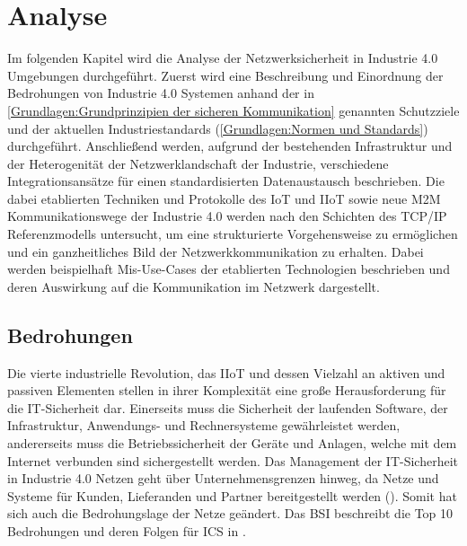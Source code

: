 \chapter{Analyse}
\label{Analyse}
Im folgenden Kapitel wird die Analyse der Netzwerksicherheit in Industrie 4.0 Umgebungen durchgeführt. Zuerst wird eine Beschreibung und Einordnung der Bedrohungen von Industrie 4.0 Systemen anhand der in \autoref{Grundlagen:Grundprinzipien der sicheren Kommunikation} genannten Schutzziele und der aktuellen Industriestandards (\autoref{Grundlagen:Normen und Standards}) durchgeführt. Anschließend werden, aufgrund der bestehenden Infrastruktur und der Heterogenität der Netzwerklandschaft der Industrie, verschiedene Integrationsansätze für einen standardisierten Datenaustausch beschrieben. Die dabei etablierten Techniken und Protokolle des \ac{IoT} und \ac{IIoT} sowie neue \ac{M2M} Kommunikationswege der Industrie 4.0 werden nach den Schichten des \ac{TCP}/\ac{IP} Referenzmodells untersucht, um eine strukturierte Vorgehensweise zu ermöglichen und ein ganzheitliches Bild der Netzwerkkommunikation zu erhalten. Dabei werden beispielhaft Mis-Use-Cases der etablierten Technologien beschrieben und deren Auswirkung auf die Kommunikation im Netzwerk dargestellt.

\section{Bedrohungen}
\label{Analyse:Bedrohungen}
Die vierte industrielle Revolution, das \ac{IIoT} und dessen Vielzahl an aktiven und passiven Elementen stellen in ihrer Komplexität eine große Herausforderung für die IT-Sicherheit dar. Einerseits muss die Sicherheit der laufenden Software, der Infrastruktur, Anwendungs- und Rechnersysteme gewährleistet werden, andererseits muss die Betriebssicherheit der Geräte und Anlagen, welche mit dem Internet verbunden sind sichergestellt werden. Das Management der IT-Sicherheit in Industrie 4.0 Netzen geht über Unternehmensgrenzen hinweg, da Netze und Systeme für Kunden, Lieferanden und Partner bereitgestellt werden (\cite{DTAG2016}). Somit hat sich auch die Bedrohungslage der Netze geändert. Das \ac{BSI} beschreibt die Top 10 Bedrohungen und deren Folgen für \ac{ICS} in \cite{ICSSec2016}.

